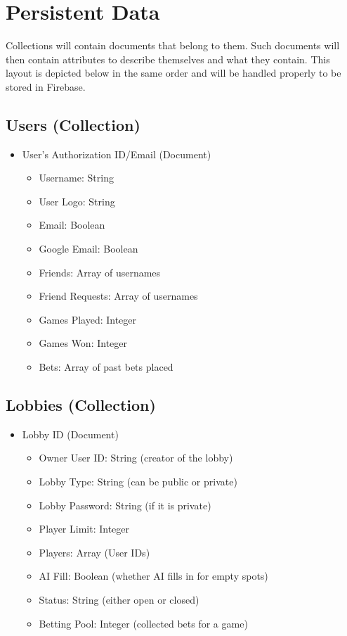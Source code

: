 \section{Persistent Data}
Collections will contain documents that belong to them. Such documents will then contain attributes to describe themselves and what they contain. This layout is depicted below in the same order and will be handled properly to be stored in Firebase.

\subsection{Users (Collection)}
\begin{itemize}
    \item User’s Authorization ID/Email (Document)
    \begin{itemize}
        \item Username: String
        \item User Logo: String
        \item Email: Boolean
        \item Google Email: Boolean
        \item Friends: Array of usernames
        \item Friend Requests: Array of usernames
        \item Games Played: Integer
        \item Games Won: Integer
        \item Bets: Array of past bets placed
    \end{itemize}
\end{itemize}

\subsection{Lobbies (Collection)}
\begin{itemize}
    \item Lobby ID (Document)
    \begin{itemize}
        \item Owner User ID: String (creator of the lobby)
        \item Lobby Type: String (can be public or private)
        \item Lobby Password: String (if it is private)
        \item Player Limit: Integer
        \item Players: Array (User IDs)
        \item AI Fill: Boolean (whether AI fills in for empty spots)
        \item Status: String (either open or closed)
        \item Betting Pool: Integer (collected bets for a game)
    \end{itemize}
\end{itemize}


